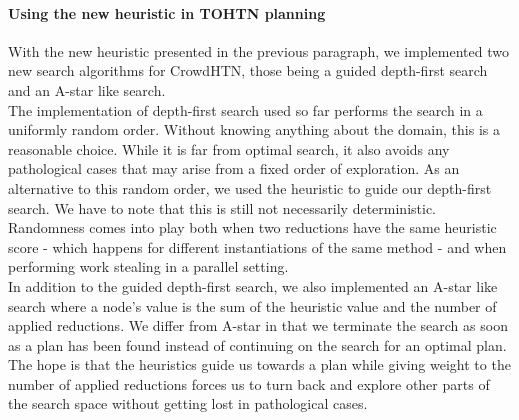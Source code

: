\paragraph{Using the new heuristic in TOHTN planning}
With the new heuristic presented in the previous paragraph, we implemented two new search algorithms for CrowdHTN, those being a guided depth-first search and an A-star like search. \\
The implementation of depth-first search used so far performs the search in a uniformly random order. Without knowing anything about the domain, this is a reasonable choice. While it is far from optimal search, it also avoids any pathological cases that may arise from a fixed order of exploration. As an alternative to this random order, we used the heuristic to guide our depth-first search. We have to note that this is still not necessarily deterministic. Randomness comes into play both when two reductions have the same heuristic score - which happens for different instantiations of the same method - and when performing work stealing in a parallel setting. \\
In addition to the guided depth-first search, we also implemented an A-star like search where a node's value is the sum of the heuristic value and the number of applied reductions. We differ from A-star in that we terminate the search as soon as a plan has been found instead of continuing on the search for an optimal plan. The hope is that the heuristics guide us towards a plan while giving weight to the number of applied reductions forces us to turn back and explore other parts of the search space without getting lost in pathological cases.

